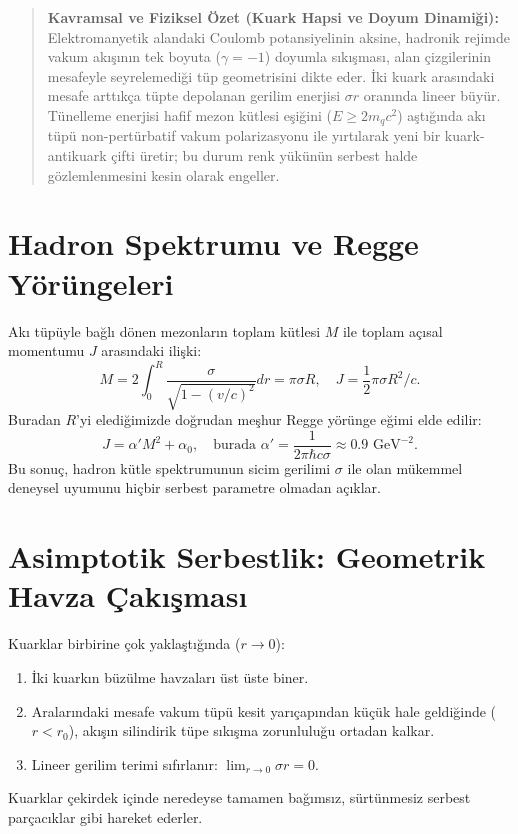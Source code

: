 \documentclass[11pt,a4paper]{article}
\begin{document}
\begin{quote}
    \small
    \textbf{Kavramsal ve Fiziksel Özet (Kuark Hapsi ve Doyum Dinamiği):} \\
    Elektromanyetik alandaki Coulomb potansiyelinin aksine, hadronik rejimde vakum akışının tek boyuta ($\gamma = -1$) doyumla sıkışması, alan çizgilerinin mesafeyle seyrelemediği tüp geometrisini dikte eder. İki kuark arasındaki mesafe arttıkça tüpte depolanan gerilim enerjisi $\sigma r$ oranında lineer büyür. Tünelleme enerjisi hafif mezon kütlesi eşiğini ($E \ge 2 m_q c^2$) aştığında akı tüpü non-pertürbatif vakum polarizasyonu ile yırtılarak yeni bir kuark-antikuark çifti üretir; bu durum renk yükünün serbest halde gözlemlenmesini kesin olarak engeller.
\end{quote}

\section{Hadron Spektrumu ve Regge Yörüngeleri}
\label{sec:regge}

Akı tüpüyle bağlı dönen mezonların toplam kütlesi $M$ ile toplam açısal momentumu $J$ arasındaki ilişki:
\begin{equation}
    M = 2 \int_0^{R} \frac{\sigma}{\sqrt{1 - (v/c)^2}} dr = \pi \sigma R, \quad J = \frac{1}{2} \pi \sigma R^2 / c.
    \label{eq:regge_turetilis}
\end{equation}
Buradan $R$'yi elediğimizde doğrudan meşhur Regge yörünge eğimi elde edilir:
\begin{equation}
    J = \alpha' M^2 + \alpha_0, \quad \text{burada } \alpha' = \frac{1}{2\pi \hbar c \sigma} \approx 0.9\text{ GeV}^{-2}.
    \label{eq:regge_sonuc}
\end{equation}
Bu sonuç, hadron kütle spektrumunun sicim gerilimi $\sigma$ ile olan mükemmel deneysel uyumunu hiçbir serbest parametre olmadan açıklar.

\section{Asimptotik Serbestlik: Geometrik Havza Çakışması}
\label{sec:asimptotik_serbestlik}

Kuarklar birbirine çok yaklaştığında ($r \to 0$):
\begin{enumerate}
    \item İki kuarkın büzülme havzaları üst üste biner.
    \item Aralarındaki mesafe vakum tüpü kesit yarıçapından küçük hale geldiğinde ($r < r_0$), akışın silindirik tüpe sıkışma zorunluluğu ortadan kalkar.
    \item Lineer gerilim terimi sıfırlanır: $\lim_{r \to 0} \sigma r = 0$.
\end{enumerate}
Kuarklar çekirdek içinde neredeyse tamamen bağımsız, sürtünmesiz serbest parçacıklar gibi hareket ederler.
\end{document}
